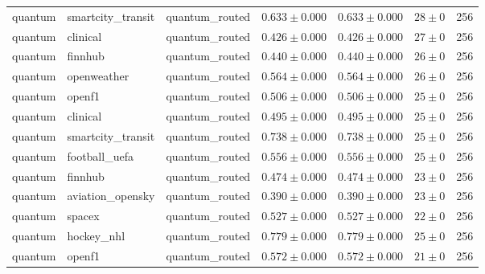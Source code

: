 \begin{table}[htbp]
\begin{tabular}{l l l r r r r}
quantum & smartcity\_transit & quantum\_routed & $0.633\pm0.000$ & $0.633\pm0.000$ & $28\pm0$ & 256 \\
quantum & clinical & quantum\_routed & $0.426\pm0.000$ & $0.426\pm0.000$ & $27\pm0$ & 256 \\
quantum & finnhub & quantum\_routed & $0.440\pm0.000$ & $0.440\pm0.000$ & $26\pm0$ & 256 \\
quantum & openweather & quantum\_routed & $0.564\pm0.000$ & $0.564\pm0.000$ & $26\pm0$ & 256 \\
quantum & openf1 & quantum\_routed & $0.506\pm0.000$ & $0.506\pm0.000$ & $25\pm0$ & 256 \\
quantum & clinical & quantum\_routed & $0.495\pm0.000$ & $0.495\pm0.000$ & $25\pm0$ & 256 \\
quantum & smartcity\_transit & quantum\_routed & $0.738\pm0.000$ & $0.738\pm0.000$ & $25\pm0$ & 256 \\
quantum & football\_uefa & quantum\_routed & $0.556\pm0.000$ & $0.556\pm0.000$ & $25\pm0$ & 256 \\
quantum & finnhub & quantum\_routed & $0.474\pm0.000$ & $0.474\pm0.000$ & $23\pm0$ & 256 \\
quantum & aviation\_opensky & quantum\_routed & $0.390\pm0.000$ & $0.390\pm0.000$ & $23\pm0$ & 256 \\
quantum & spacex & quantum\_routed & $0.527\pm0.000$ & $0.527\pm0.000$ & $22\pm0$ & 256 \\
quantum & hockey\_nhl & quantum\_routed & $0.779\pm0.000$ & $0.779\pm0.000$ & $25\pm0$ & 256 \\
quantum & openf1 & quantum\_routed & $0.572\pm0.000$ & $0.572\pm0.000$ & $21\pm0$ & 256 \\
\hline
\end{tabular}
\end{table}
